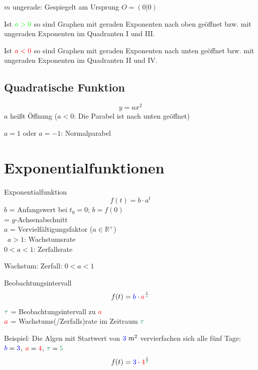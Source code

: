 \begin{multicols}{2}
$m$ ungerade: Gespiegelt am Ursprung $O=(0|0)$

Ist ${\color{green}a>0}$ so sind Graphen mit
geraden Exponenten nach oben geöffnet bzw. mit ungeraden Exponenten im
Quadranten I und III.

Ist ${\color{red}a<0}$ so sind Graphen mit
geraden Exponenten nach unten geöffnet bzw. mit ungeraden Exponenten
im Quadranten II und IV.



\hrulefill  
\subsection*{Quadratische Funktion}
$$y=ax^2$$
$a$ heißt Öffnung ($a<0$: Die Parabel ist nach unten geöffnet)

$a=1$ oder $a=-1$: Normalparabel

\hrulefill

\section*{Exponentialfunktionen}
\begin{definition*}{Exponentialfunktion}{}
$$f(t) = b\cdot{}a^t$$
$b$ = Anfangswert bei $t_0=0$; $b=f(0)$\\
\phantom{$b$} = $y$-Achsenabschnitt\\
$a$ = Vervielfältigungsfaktor ($a\in\mathbb{R}^{+}$)\\\
$a>1$: Wachstumsrate\\
$0<a<1$: Zerfallsrate
\end{definition*}

Wachstum:
Zerfall: $0<a<1$



\begin{rezept*}{Beobachtungsintervall}{}
$$f(t) = {\color{blue}b}\cdot{}{\color{red}a}^{\frac{t}{\color{ForestGreen}\tau}}$$
$\color{ForestGreen}\tau$ = Beobachtungsintervall zu $\color{red}a$\\
$\color{red}a$ = Wachstums(/Zerfalls)rate im Zeitraum $\color{ForestGreen}\tau$

Beispiel: Die Algen mit Startwert von ${\color{blue}3} \textrm{ m}^2$ ver{\color{red}vier}fachen
sich alle {\color{ForestGreen}fünf} Tage:\\
${\color{blue}b}={\color{blue}3}$, ${\color{red}a}={\color{red}4}$, ${\color{ForestGreen}\tau}={\color{ForestGreen}5}$
$$f(t)= {\color{blue}3}\cdot{}{\color{red}4}^\frac{t}{\color{ForestGreen}5}$$
\end{rezept*}



\end{multicols}
